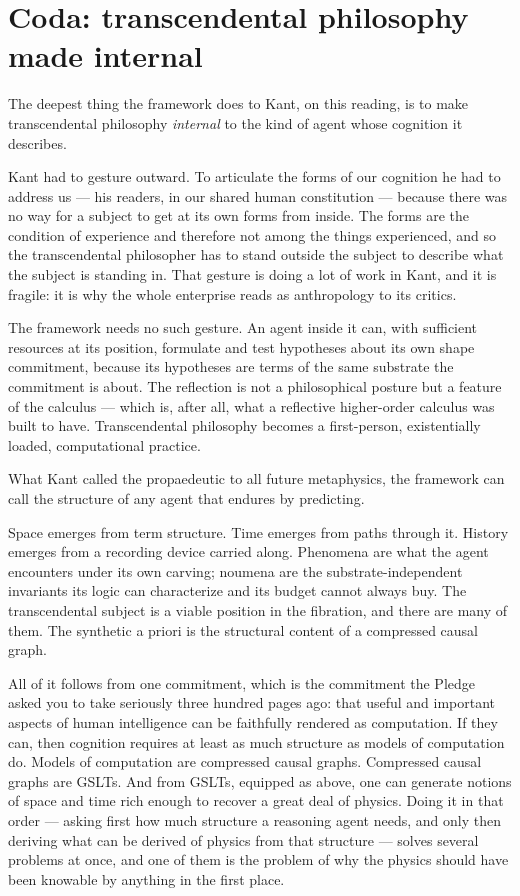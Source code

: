 \section{Coda: transcendental philosophy made internal}
\label{sec:kant-coda}

The deepest thing the framework does to Kant, on this reading, is to
make transcendental philosophy \emph{internal} to the kind of agent
whose cognition it describes.

Kant had to gesture outward.
To articulate the forms of our cognition he had to address us --- his
readers, in our shared human constitution --- because there was no
way for a subject to get at its own forms from inside.
The forms are the condition of experience and therefore not among
the things experienced, and so the transcendental philosopher has
to stand outside the subject to describe what the subject is
standing in.
That gesture is doing a lot of work in Kant, and it is fragile: it
is why the whole enterprise reads as anthropology to its critics.

The framework needs no such gesture.
An agent inside it can, with sufficient resources at its position,
formulate and test hypotheses about its own shape commitment,
because its hypotheses are terms of the same substrate the
commitment is about.
The reflection is not a philosophical posture but a feature of the
calculus --- which is, after all, what a reflective higher-order
calculus was built to have.
Transcendental philosophy becomes a first-person, existentially
loaded, computational practice.

What Kant called the propaedeutic to all future metaphysics, the
framework can call the structure of any agent that endures by
predicting.

Space emerges from term structure.
Time emerges from paths through it.
History emerges from a recording device carried along.
Phenomena are what the agent encounters under its own carving;
noumena are the substrate-independent invariants its logic can
characterize and its budget cannot always buy.
The transcendental subject is a viable position in the fibration,
and there are many of them.
The synthetic a priori is the structural content of a compressed
causal graph.

All of it follows from one commitment, which is the commitment the
Pledge asked you to take seriously three hundred pages ago: that
useful and important aspects of human intelligence can be
faithfully rendered as computation.
If they can, then cognition requires at least as much structure as
models of computation do.
Models of computation are compressed causal graphs.
Compressed causal graphs are GSLTs.
And from GSLTs, equipped as above, one can generate notions of
space and time rich enough to recover a great deal of physics.
Doing it in that order --- asking first how much structure a
reasoning agent needs, and only then deriving what can be derived
of physics from that structure --- solves several problems at once,
and one of them is the problem of why the physics should have been
knowable by anything in the first place.

